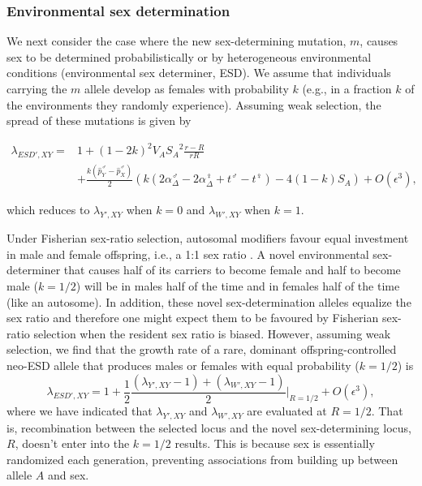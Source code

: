 \documentclass[12pt]{article}
\begin{document}
\subsubsection*{Environmental sex determination}

We next consider the case where the new sex-determining mutation, $m$, causes sex to be determined probabilistically or by heterogeneous environmental conditions (environmental sex determiner, ESD). 
We assume that individuals carrying the $m$ allele develop as females with probability $k$ (e.g., in a fraction $k$ of the environments they randomly experience). 
Assuming weak selection, the spread of these mutations is given by 

\begin{equation}
\begin{split}
\lambda_{ESD',XY} =& 1 + (1-2k)^2V_{A}{S_{A}}^2\frac{r-R}{r R} \\
&+\frac{k(\hat{p}^\male_Y-\hat{p}^\male_X)}{2}\left(k\left(2\alpha_{\Delta}^\male-2\alpha_{\Delta}^\female+t^\male-t^\female \right) -4(1-k)S_{A}\right)+O\left(\epsilon^3\right),
\end{split}
\label{eq:lambda_ESD_k}
\end{equation}

\noindent
which reduces to $\lambda_{Y',XY}$ when $k=0$ and $\lambda_{W',XY}$ when $k=1$. 

Under Fisherian sex-ratio selection, autosomal modifiers favour equal investment in male and female offspring, i.e., a 1:1 sex ratio \citep{Fisher:1930wy,Charnov:1982wg,West:2009we}. 
A novel environmental sex-determiner that causes half of its carriers to become female and half to become male ($k=1/2$) will be in males half of the time and in females half of the time (like an autosome).
In addition, these novel sex-determination alleles equalize the sex ratio and therefore one might expect them to be favoured by Fisherian sex-ratio selection when the resident sex ratio is biased.
However, assuming weak selection, we find that the growth rate of a rare, dominant offspring-controlled neo-ESD allele that produces males or females with equal probability ($k=1/2$) is
\begin{equation}
\lambda_{ESD',XY} =1+ \frac{1}{2}\frac{(\lambda_{Y',XY}-1) + (\lambda_{W',XY}-1)}{2} \Big|_{R=1/2} + O\left(\epsilon^3\right),
\label{eq:lambda_ESD}
\end{equation}
\noindent
where we have indicated that $\lambda_{Y',XY}$ and $\lambda_{W',XY}$ are evaluated at $R=1/2$.
That is, recombination between the selected locus and the novel sex-determining locus, $R$, doesn't enter into the $k=1/2$ results.
This is because sex is essentially randomized each generation, %
preventing associations from building up between allele $A$ and sex.  
\end{document}
